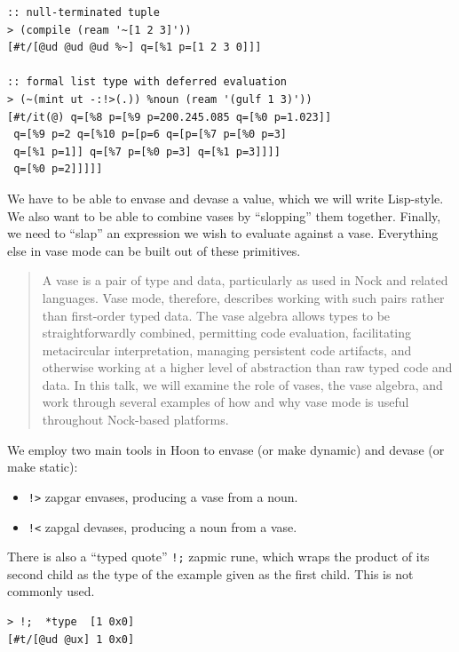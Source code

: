 \documentclass[twoside]{article}
\begin{document}
\begin{lstlisting}[style=listingcode]
:: null-terminated tuple
> (compile (ream '~[1 2 3]'))
[#t/[@ud @ud @ud %~] q=[%1 p=[1 2 3 0]]]

:: formal list type with deferred evaluation
> (~(mint ut -:!>(.)) %noun (ream '(gulf 1 3)'))
[#t/it(@) q=[%8 p=[%9 p=200.245.085 q=[%0 p=1.023]]
 q=[%9 p=2 q=[%10 p=[p=6 q=[p=[%7 p=[%0 p=3]
 q=[%1 p=1]] q=[%7 p=[%0 p=3] q=[%1 p=3]]]]
 q=[%0 p=2]]]]]
\end{lstlisting}

We have to be able to envase and devase a value, which we will write Lisp-style.  We also want to be able to combine vases by “slopping” them together.  Finally, we need to “slap” an expression we wish to evaluate against a vase.  Everything else in vase mode can be built out of these primitives.

\begin{quote}
A vase is a pair of type and data, particularly as used in Nock and related languages.  Vase mode, therefore, describes working with such pairs rather than first-order typed data.  The vase algebra allows types to be straightforwardly combined, permitting code evaluation, facilitating metacircular interpretation, managing persistent code artifacts, and otherwise working at a higher level of abstraction than raw typed code and data.  In this talk, we will examine the role of vases, the vase algebra, and work through several examples of how and why vase mode is useful throughout Nock-based platforms.
\end{quote}

\noindent
We employ two main tools in Hoon to envase (or make dynamic) and devase (or make static):

\begin{itemize}
  \item  \lstinline[style=inlinecode]{!>} zapgar envases, producing a vase from a noun.
  \item  \lstinline[style=inlinecode]{!<} zapgal devases, producing a noun from a vase.
\end{itemize}

\noindent
There is also a “typed quote” \lstinline[style=inlinecode]{!;} zapmic rune, which wraps the product of its second child as the type of the example given as the first child.  This is not commonly used.

\begin{lstlisting}[style=listingcode]
> !;  *type  [1 0x0]
[#t/[@ud @ux] 1 0x0]
\end{lstlisting}
\end{document}
